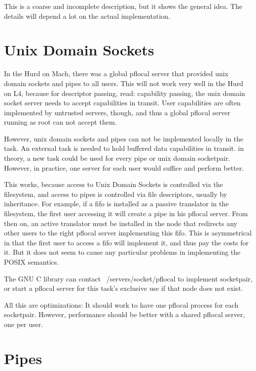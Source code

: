 This is a coarse and incomplete description, but it shows the general
idea.  The details will depend a lot on the actual implementation.


\section{Unix Domain Sockets}
\label{unixdomainsockets}

In the Hurd on Mach, there was a global pflocal server that provided
unix domain sockets and pipes to all users.  This will not work very
well in the Hurd on L4, because for descriptor passing, read:
capability passing, the unix domain socket server needs to accept
capabilities in transit.  User capabilities are often implemented by
untrusted servers, though, and thus a global pflocal server running as
root can not accept them.

However, unix domain sockets and pipes can not be implemented locally
in the task.  An external task is needed to hold buffered data
capabilities in transit.  in theory, a new task could be used for
every pipe or unix domain socketpair.  However, in practice, one
server for each user would suffice and perform better.

This works, because access to Unix Domain Sockets is controlled via
the filesystem, and access to pipes is controlled via file
descriptors, usually by inheritance.  For example, if a fifo is
installed as a passive translator in the filesystem, the first user
accessing it will create a pipe in his pflocal server.  From then on,
an active translator must be installed in the node that redirects any
other users to the right pflocal server implementing this fifo.  This
is asymmetrical in that the first user to access a fifo will implement
it, and thus pay the costs for it.  But it does not seem to cause any
particular problems in implementing the POSIX semantics.

The GNU C library can contact ~/servers/socket/pflocal to implement
socketpair, or start a pflocal server for this task's exclusive use if
that node does not exist.

All this are optimizations: It should work to have one pflocal process
for each socketpair.  However, performance should be better with a
shared pflocal server, one per user.


\section{Pipes}

